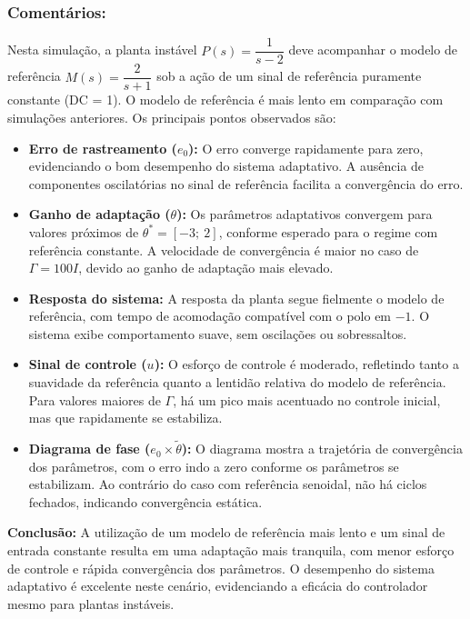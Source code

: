 \documentclass[10pt]{article}
\begin{document}
\subsubsection{Comentários:}

Nesta simulação, a planta instável $P(s) = \dfrac{1}{s - 2}$ deve acompanhar o modelo de referência $M(s) = \dfrac{2}{s + 1}$ sob a ação de um sinal de referência puramente constante (DC = 1). O modelo de referência é mais lento em comparação com simulações anteriores. Os principais pontos observados são:

\begin{itemize}
    \item \textbf{Erro de rastreamento ($e_0$):} O erro converge rapidamente para zero, evidenciando o bom desempenho do sistema adaptativo. A ausência de componentes oscilatórias no sinal de referência facilita a convergência do erro.

    \item \textbf{Ganho de adaptação ($\theta$):} Os parâmetros adaptativos convergem para valores próximos de $\theta^* = [-3;\ 2]$, conforme esperado para o regime com referência constante. A velocidade de convergência é maior no caso de $\Gamma = 100I$, devido ao ganho de adaptação mais elevado.

    \item \textbf{Resposta do sistema:} A resposta da planta segue fielmente o modelo de referência, com tempo de acomodação compatível com o polo em $-1$. O sistema exibe comportamento suave, sem oscilações ou sobressaltos.

    \item \textbf{Sinal de controle ($u$):} O esforço de controle é moderado, refletindo tanto a suavidade da referência quanto a lentidão relativa do modelo de referência. Para valores maiores de $\Gamma$, há um pico mais acentuado no controle inicial, mas que rapidamente se estabiliza.

    \item \textbf{Diagrama de fase ($e_0 \times \tilde{\theta}$):} O diagrama mostra a trajetória de convergência dos parâmetros, com o erro indo a zero conforme os parâmetros se estabilizam. Ao contrário do caso com referência senoidal, não há ciclos fechados, indicando convergência estática.
\end{itemize}

\textbf{Conclusão:} A utilização de um modelo de referência mais lento e um sinal de entrada constante resulta em uma adaptação mais tranquila, com menor esforço de controle e rápida convergência dos parâmetros. O desempenho do sistema adaptativo é excelente neste cenário, evidenciando a eficácia do controlador mesmo para plantas instáveis.
\end{document}

